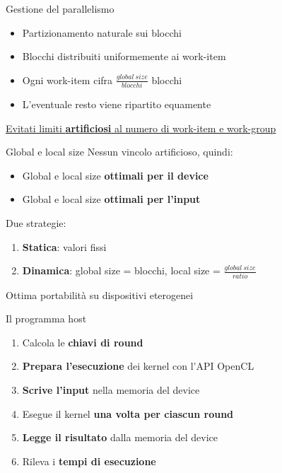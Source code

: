 \documentclass[11pt,xcolor=dvipsnames]{beamer}
\begin{document}
\begin{frame}{Gestione del parallelismo}
\begin{itemize}
\item Partizionamento naturale sui blocchi
\item Blocchi distribuiti uniformemente ai work-item
\item Ogni work-item cifra $\frac{global~size}{blocchi}$ blocchi
\item L'eventuale resto viene ripartito equamente
\end{itemize}

\vspace{3mm}
\begin{center}
\underline{Evitati limiti \textbf{artificiosi} al numero di work-item e work-group}
\end{center}

\end{frame}

\begin{frame}{Global e local size}
\vspace{4mm}
Nessun vincolo artificioso, quindi:
\begin{itemize}
\item Global e local size \textbf{ottimali per il device}
\item Global e local size \textbf{ottimali per l'input}
\end{itemize}

\vspace{3mm}
Due strategie:
\begin{enumerate}
\item \textbf{Statica}: valori fissi
\item \textbf{Dinamica}: global size = blocchi, local size = $\frac{global~size}{ratio}$
\end{enumerate}

\vspace{8mm}
\begin{center}
\begin{block}{}
\centering Ottima portabilità su dispositivi eterogenei
\end{block}
\end{center}


\end{frame}

\begin{frame}{Il programma host}
\begin{enumerate}
\item Calcola le \textbf{chiavi di round}
\item \textbf{Prepara l'esecuzione} dei kernel con l'API OpenCL
\item \textbf{Scrive l'input} nella memoria del device
\item Esegue il kernel \textbf{una volta per ciascun round}
\item \textbf{Legge il risultato} dalla memoria del device
\item Rileva i \textbf{tempi di esecuzione}
\end{enumerate}
\end{frame}
\end{document}
